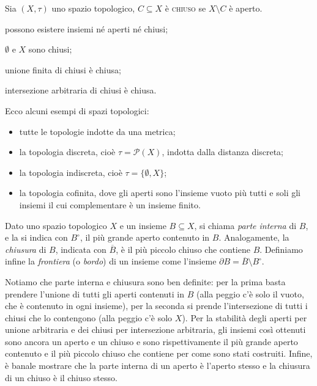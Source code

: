 \documentclass{article}
\begin{document}
\begin{defn}
    Sia $(X, \tau)$ uno spazio topologico, $C \subseteq X$ è \textsc{chiuso} se
    $X \setminus C$ è aperto.
\end{defn}

\begin{oss}
\begin{nlist}
\item possono esistere insiemi né aperti né chiusi;
\item $\emptyset$ e $X$ sono chiusi;
\item unione finita di chiusi è chiusa;
\item intersezione arbitraria di chiusi è chiusa.
\end{nlist}
\end{oss}

\begin{ex}
    Ecco alcuni esempi di spazi topologici:
    \begin{itemize}
        \item tutte le topologie indotte da una metrica;
        \item la topologia discreta, cioè $\tau=\mathcal{P}(X)$, indotta dalla
        distanza discreta;
        \item la topologia indiscreta, cioè $\tau=\{ \emptyset, X \}$;
        \item la topologia cofinita, dove gli aperti sono l'insieme vuoto più
        tutti e soli gli insiemi il cui complementare è un insieme finito.
    \end{itemize}
\end{ex}

\begin{defn}
	Dato uno spazio topologico $X$ e un insieme $B \subseteq X$, si chiama
	\textit{parte interna} di $B$, e la si indica con $B^{\circ}$, il più grande
	aperto contenuto in $B$. Analogamente, la \textit{chiusura} di $B$, indicata
	con $\overline{B}$, è il più piccolo chiuso che contiene $B$. Definiamo
	infine la \textit{frontiera} (o \textit{bordo}) di un insieme come l'insieme
	$\partial B= \overline{B} \setminus B^{\circ}$.
\end{defn}

Notiamo che parte interna e chiusura sono ben definite: per la prima basta
prendere l'unione di tutti gli aperti contenuti in $B$ (alla peggio c'è solo il
vuoto, che è contenuto in ogni insieme), per la seconda si prende l'intersezione
di tutti i chiusi che lo contengono (alla peggio c'è solo $X$). Per la stabilità
degli aperti per unione arbitraria e dei chiusi per intersezione arbitraria, gli
insiemi così ottenuti sono ancora un aperto e un chiuso e sono rispettivamente
il più grande aperto contenuto e il più piccolo chiuso che contiene per come
sono stati costruiti. Infine, è banale mostrare che la parte interna di un
aperto è l'aperto stesso e la chiusura di un chiuso è il chiuso stesso.
\end{document}
